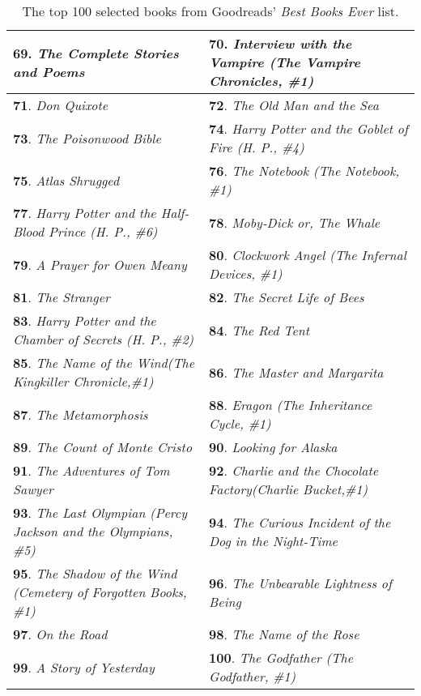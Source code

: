 \begin{table*}[htbp]
{\begin{tabular}{p{3.2in}|p{3.2in}}
\textbf{69}. \textit{{The Complete Stories and Poems}} & \textbf{70}. \textit{{Interview with the Vampire (The Vampire Chronicles, \#1)}}\\ \hline
\textbf{71}. \textit{{Don Quixote}} & \textbf{72}. \textit{{The Old Man and the Sea}}\\ \hline
\textbf{73}. \textit{{The Poisonwood Bible}} & \textbf{74}. \textit{{Harry Potter and the Goblet of Fire (H. P., \#4)}}\\ \hline
\textbf{75}. \textit{{Atlas Shrugged}} & \textbf{76}. \textit{{The Notebook (The Notebook, \#1)}}\\ \hline
\textbf{77}. \textit{{Harry Potter and the Half-Blood Prince (H. P., \#6)}} & \textbf{78}. \textit{{Moby-Dick or, The Whale}}\\ \hline
\textbf{79}. \textit{{A Prayer for Owen Meany}} & \textbf{80}. \textit{{Clockwork Angel (The Infernal Devices, \#1)}}\\ \hline
\textbf{81}. \textit{{The Stranger}} & \textbf{82}. \textit{{The Secret Life of Bees}}\\ \hline
\textbf{83}. \textit{{Harry Potter and the Chamber of Secrets (H. P., \#2)}} & \textbf{84}. \textit{{The Red Tent}}\\ \hline
\textbf{85}. \textit{{The Name of the Wind(The Kingkiller Chronicle,\#1)}} & \textbf{86}. \textit{{The Master and Margarita}}\\ \hline
\textbf{87}. \textit{{The Metamorphosis}} & \textbf{88}. \textit{{Eragon (The Inheritance Cycle, \#1)}}\\ \hline
\textbf{89}. \textit{{The Count of Monte Cristo}} & \textbf{90}. \textit{{Looking for Alaska}}\\ \hline
\textbf{91}. \textit{{The Adventures of Tom Sawyer}} & \textbf{92}. \textit{{Charlie and the Chocolate Factory(Charlie Bucket,\#1)}}\\ \hline
\textbf{93}. \textit{{The Last Olympian (Percy Jackson and the Olympians, \#5)}} & \textbf{94}. \textit{{The Curious Incident of the Dog in the Night-Time}}\\ \hline
\textbf{95}. \textit{{The Shadow of the Wind (Cemetery of Forgotten Books, \#1)}} & \textbf{96}. \textit{{The Unbearable Lightness of Being}}\\ \hline
\textbf{97}. \textit{{On the Road}} & \textbf{98}. \textit{{The Name of the Rose}}\\ \hline
\textbf{99}. \textit{{A Story of Yesterday}} & \textbf{100}. \textit{{The Godfather (The Godfather, \#1)}} 
\\ 
\bottomrule

\end{tabular}}

\caption{The top 100 selected books from Goodreads' \textit{Best Books Ever} list. }
\label{tab:selected_books}
\end{table*}

